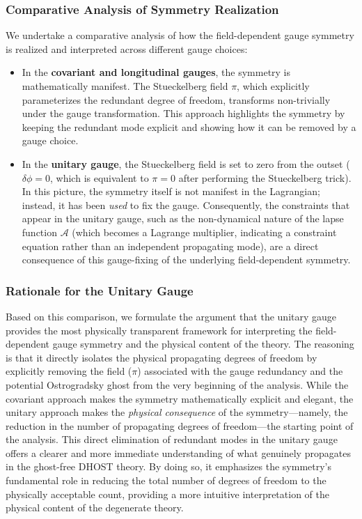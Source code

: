 \documentclass[twocolumn]{aastex631}
\begin{document}
\subsubsection{Comparative Analysis of Symmetry Realization}
We undertake a comparative analysis of how the field-dependent gauge symmetry is realized and interpreted across different gauge choices:
\begin{itemize}
    \item In the \textbf{covariant and longitudinal gauges}, the symmetry is mathematically manifest. The Stueckelberg field $\pi$, which explicitly parameterizes the redundant degree of freedom, transforms non-trivially under the gauge transformation. This approach highlights the symmetry by keeping the redundant mode explicit and showing how it can be removed by a gauge choice.
    \item In the \textbf{unitary gauge}, the Stueckelberg field is set to zero from the outset ($\delta\phi=0$, which is equivalent to $\pi=0$ after performing the Stueckelberg trick). In this picture, the symmetry itself is not manifest in the Lagrangian; instead, it has been \textit{used} to fix the gauge. Consequently, the constraints that appear in the unitary gauge, such as the non-dynamical nature of the lapse function $\mathcal{A}$ (which becomes a Lagrange multiplier, indicating a constraint equation rather than an independent propagating mode), are a direct consequence of this gauge-fixing of the underlying field-dependent symmetry.
\end{itemize}

\subsubsection{Rationale for the Unitary Gauge}
Based on this comparison, we formulate the argument that the unitary gauge provides the most physically transparent framework for interpreting the field-dependent gauge symmetry and the physical content of the theory. The reasoning is that it directly isolates the physical propagating degrees of freedom by explicitly removing the field ($\pi$) associated with the gauge redundancy and the potential Ostrogradsky ghost from the very beginning of the analysis. While the covariant approach makes the symmetry mathematically explicit and elegant, the unitary approach makes the \textit{physical consequence} of the symmetry---namely, the reduction in the number of propagating degrees of freedom---the starting point of the analysis. This direct elimination of redundant modes in the unitary gauge offers a clearer and more immediate understanding of what genuinely propagates in the ghost-free DHOST theory. By doing so, it emphasizes the symmetry's fundamental role in reducing the total number of degrees of freedom to the physically acceptable count, providing a more intuitive interpretation of the physical content of the degenerate theory.
\end{document}
